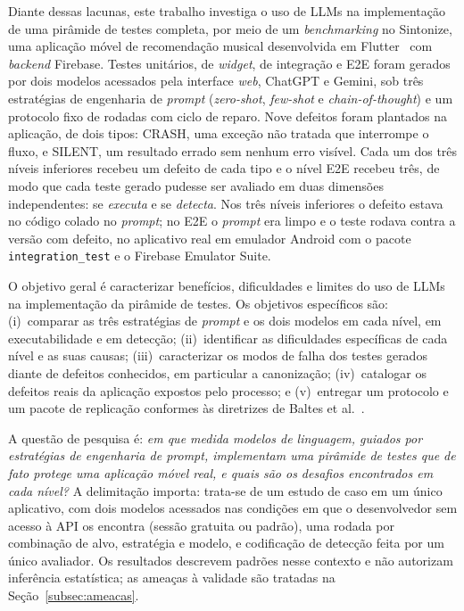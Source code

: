 \documentclass[12pt]{article}
\begin{document}
Diante dessas lacunas, este trabalho investiga o uso de LLMs na implementação
de uma pirâmide de testes completa, por meio de um \textit{benchmarking} no
Sintonize, uma aplicação móvel de recomendação musical desenvolvida em
Flutter~\cite{flutter} com \textit{backend} Firebase. Testes unitários, de
\textit{widget}, de integração e E2E foram gerados por dois modelos acessados
pela interface \textit{web}, ChatGPT e Gemini, sob três estratégias de
engenharia de \textit{prompt} (\textit{zero-shot}, \textit{few-shot} e
\textit{chain-of-thought}) e um protocolo fixo de rodadas com ciclo de
reparo. Nove defeitos foram plantados na aplicação, de dois tipos: CRASH, uma
exceção não tratada que interrompe o fluxo, e SILENT, um resultado errado sem
nenhum erro visível. Cada um dos três níveis inferiores recebeu um defeito de
cada tipo e o nível E2E recebeu três, de modo que cada teste gerado pudesse
ser avaliado em duas dimensões independentes: se \emph{executa} e se
\emph{detecta}. Nos três níveis inferiores o defeito estava no código colado
no \textit{prompt}; no E2E o \textit{prompt} era limpo e o teste rodava
contra a versão com defeito, no aplicativo real em emulador Android com o
pacote \texttt{integration\_test} e o Firebase Emulator Suite.

O objetivo geral é caracterizar benefícios, dificuldades e limites do uso de
LLMs na implementação da pirâmide de testes. Os objetivos específicos são:
(i)~comparar as três estratégias de \textit{prompt} e os dois modelos em cada
nível, em executabilidade e em detecção; (ii)~identificar as dificuldades
específicas de cada nível e as suas causas; (iii)~caracterizar os modos de
falha dos testes gerados diante de defeitos conhecidos, em particular a
canonização; (iv)~catalogar os defeitos reais da aplicação expostos pelo
processo; e (v)~entregar um protocolo e um pacote de replicação conformes às
diretrizes de Baltes et al.~\cite{baltes2026guidelines}.

A questão de pesquisa é: \textit{em que medida modelos de linguagem, guiados
por estratégias de engenharia de \textit{prompt}, implementam uma pirâmide de
testes que de fato protege uma aplicação móvel real, e quais são os desafios
encontrados em cada nível?} A delimitação importa: trata-se de um estudo de
caso em um único aplicativo, com dois modelos acessados nas condições em que o
desenvolvedor sem acesso à API os encontra (sessão gratuita ou padrão), uma
rodada por combinação de alvo, estratégia e modelo, e codificação de
detecção feita por um único avaliador. Os resultados descrevem padrões
nesse contexto e não autorizam inferência estatística; as ameaças à validade
são tratadas na Seção~\ref{subsec:ameacas}.
\end{document}
